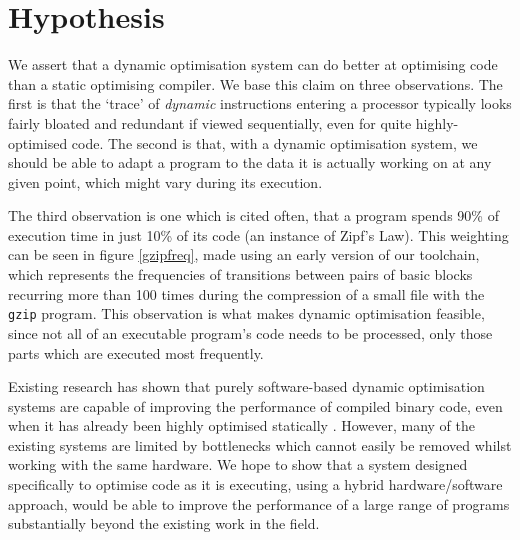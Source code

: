 \documentclass[11pt,letterpaper,onecolumn,notitlepage]{article}
\begin{document}
\section{Hypothesis}

We assert that a dynamic optimisation system can do better at optimising code than a static optimising compiler. We base this claim on three observations. The first is that the `trace' of {\em dynamic} instructions entering a processor typically looks fairly bloated and redundant if viewed sequentially, even for quite highly-optimised code. The second is that, with a dynamic optimisation system, we should be able to adapt a program to the data it is actually working on at any given point, which might vary during its execution.

The third observation is one which is cited often, that a program spends 90\% of execution time in just 10\% of its code (an instance of Zipf's Law). This weighting can be seen in figure \ref{gzipfreq}, made using an early version of our toolchain, which represents the frequencies of transitions between pairs of basic blocks recurring more than 100 times during the compression of a small file with the {\tt gzip} program. This observation is what makes dynamic optimisation feasible, since not all of an executable program's code needs to be processed, only those parts which are executed most frequently.

Existing research has shown that purely software-based dynamic optimisation systems are capable of improving the performance of compiled binary code, even when it has already been highly optimised statically \cite{Dynamo}. However, many of the existing systems are limited by bottlenecks which cannot easily be removed whilst working with the same hardware. We hope to show that a system designed specifically to optimise code as it is executing, using a hybrid hardware/software approach, would be able to improve the performance of a large range of programs substantially beyond the existing work in the field.
\end{document}
